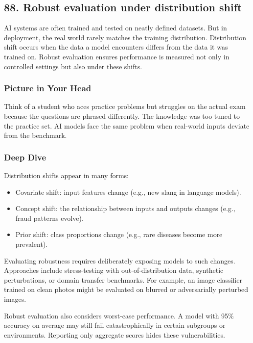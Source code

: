\documentclass[
  letterpaper,
  DIV=11,
  numbers=noendperiod]{scrreprt}
\providecommand{\tightlist}{%
  \setlength{\itemsep}{0pt}\setlength{\parskip}{0pt}}
\begin{document}
\subsection{88. Robust evaluation under distribution
shift}\label{robust-evaluation-under-distribution-shift}

AI systems are often trained and tested on neatly defined datasets. But
in deployment, the real world rarely matches the training distribution.
Distribution shift occurs when the data a model encounters differs from
the data it was trained on. Robust evaluation ensures performance is
measured not only in controlled settings but also under these shifts.

\subsubsection{Picture in Your Head}\label{picture-in-your-head-87}

Think of a student who aces practice problems but struggles on the
actual exam because the questions are phrased differently. The knowledge
was too tuned to the practice set. AI models face the same problem when
real-world inputs deviate from the benchmark.

\subsubsection{Deep Dive}\label{deep-dive-87}

Distribution shifts appear in many forms:

\begin{itemize}
\tightlist
\item
  Covariate shift: input features change (e.g., new slang in language
  models).
\item
  Concept shift: the relationship between inputs and outputs changes
  (e.g., fraud patterns evolve).
\item
  Prior shift: class proportions change (e.g., rare diseases become more
  prevalent).
\end{itemize}

Evaluating robustness requires deliberately exposing models to such
changes. Approaches include stress-testing with out-of-distribution
data, synthetic perturbations, or domain transfer benchmarks. For
example, an image classifier trained on clean photos might be evaluated
on blurred or adversarially perturbed images.

Robust evaluation also considers worst-case performance. A model with
95\% accuracy on average may still fail catastrophically in certain
subgroups or environments. Reporting only aggregate scores hides these
vulnerabilities.
\end{document}
